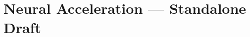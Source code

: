 \documentclass{article}
\begin{document}
\section*{Neural Acceleration --- Standalone Draft}


\end{document}
